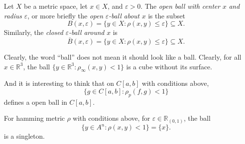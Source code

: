 \begin{definition}
	Let $X$ be a metric space, let $x \in X$, and $\varepsilon > 0$. The \textit{open ball with center $x$ and radius $\varepsilon$}, or more briefly the \textit{open $\varepsilon$-ball about $x$} is the subset
	$$
	B(x, \varepsilon) = \{ y \in X: \rho (x,y) \le \varepsilon \} \subseteq X.
	$$
	Similarly, the \textit{closed $\varepsilon$-ball around $x$} is
	$$
	\overline B (x, \varepsilon) = \{ y \in X: \rho(x,y) \le \varepsilon \} \subseteq X.
	$$
\end{definition}


\begin{note}
	Clearly, the word ``ball'' does not mean it should look like a ball. Clearly, for all $x \in \mathbb R^3$, the ball $\{ y \in \mathbb R^3 : \rho_\infty (x,y) < 1 \}$ is a cube without its surface.
	
	And it is interesting to think that on $C[a,b]$ with conditions above,
	$$
	\{ g \in C[a,b] : \rho_p(f,g) < 1 \}
	$$
	defines a open ball in $C[a,b]$.
	
	
\end{note}


\begin{note}
	For hamming metric $\rho$ with conditions above, for $\varepsilon \in \mathbb R_{(0,1)}$, the ball
	$$
	\{ y \in A^n : \rho(x,y) < 1 \} = \{x\}.
	$$
	is a singleton.
\end{note}






































%